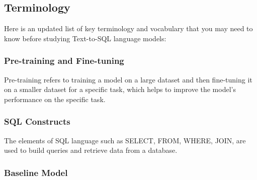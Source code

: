 \subsection{Terminology}

Here is an updated list of key terminology and vocabulary that you may need to know before studying Text-to-SQL language models:


\subsubsection{Pre-training and Fine-tuning}

Pre-training refers to training a model on a large dataset and then fine-tuning it on a smaller dataset for a specific task, which helps to improve the model's performance on the specific task.

\subsubsection{SQL Constructs}

The elements of SQL language such as SELECT, FROM, WHERE, JOIN, are used to build queries and retrieve data from a database.



\subsubsection{Baseline Model}

